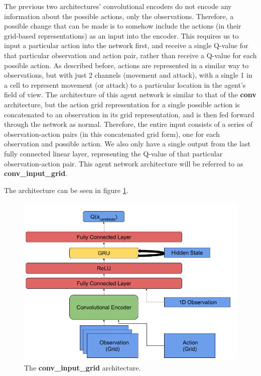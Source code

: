 The previous two architectures’ convolutional encoders do not encode any information about the possible actions, only the observations. Therefore, a possible change that can be made is to somehow include the actions (in their grid-based representations) as an input into the encoder. This requires us to input a particular action into the network first, and receive a single Q-value for that particular observation and action pair, rather than receive a Q-value for each possible action. As described before, actions are represented in a similar way to observations, but with just 2 channels (movement and attack), with a single 1 in a cell to represent movement (or attack) to a particular location in the agent's field of view. The architecture of this agent network is similar to that of the \textbf{conv} architecture, but the action grid representation for a single possible action is concatenated to an observation in its grid representation, and is then fed forward through the network as normal. Therefore, the entire input consists of a series of observation-action pairs (in this concatenated grid form), one for each observation and possible action. We also only have a single output from the last fully connected linear layer, representing the Q-value of that particular observation-action pair. This agent network architecture will be referred to as \textbf{conv\_input\_grid}.

The architecture can be seen in figure \ref{fig:conv_input_grid_agent_diagram}.

\begin{figure}
    \centering
    \includegraphics[scale=0.45]{images/agent_diagrams/rnn_conv_ddpg_input_grid_agent_diagram.png}
    \caption{The \textbf{conv\_input\_grid} architecture.}
    \label{fig:conv_input_grid_agent_diagram}
\end{figure}





